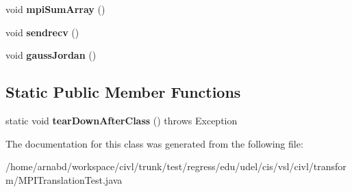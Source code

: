 \begin{DoxyCompactItemize}
\item 
\hypertarget{classedu_1_1udel_1_1cis_1_1vsl_1_1civl_1_1transform_1_1MPITranslationTest_a12381d3fd454d4961687350c6e621189}{}void {\bfseries mpi\+Sum\+Array} ()\label{classedu_1_1udel_1_1cis_1_1vsl_1_1civl_1_1transform_1_1MPITranslationTest_a12381d3fd454d4961687350c6e621189}

\item 
\hypertarget{classedu_1_1udel_1_1cis_1_1vsl_1_1civl_1_1transform_1_1MPITranslationTest_a9a229812fbd00f936189de308ba78826}{}void {\bfseries sendrecv} ()\label{classedu_1_1udel_1_1cis_1_1vsl_1_1civl_1_1transform_1_1MPITranslationTest_a9a229812fbd00f936189de308ba78826}

\item 
\hypertarget{classedu_1_1udel_1_1cis_1_1vsl_1_1civl_1_1transform_1_1MPITranslationTest_abfcb1e4d449b0b4f4dbc44675836613e}{}void {\bfseries gauss\+Jordan} ()\label{classedu_1_1udel_1_1cis_1_1vsl_1_1civl_1_1transform_1_1MPITranslationTest_abfcb1e4d449b0b4f4dbc44675836613e}

\end{DoxyCompactItemize}
\subsection*{Static Public Member Functions}
\begin{DoxyCompactItemize}
\item 
\hypertarget{classedu_1_1udel_1_1cis_1_1vsl_1_1civl_1_1transform_1_1MPITranslationTest_aecf083c083886027bdfc26ca5322ab3a}{}static void {\bfseries tear\+Down\+After\+Class} ()  throws Exception \label{classedu_1_1udel_1_1cis_1_1vsl_1_1civl_1_1transform_1_1MPITranslationTest_aecf083c083886027bdfc26ca5322ab3a}

\end{DoxyCompactItemize}


The documentation for this class was generated from the following file\+:\begin{DoxyCompactItemize}
\item 
/home/arnabd/workspace/civl/trunk/test/regress/edu/udel/cis/vsl/civl/transform/M\+P\+I\+Translation\+Test.\+java\end{DoxyCompactItemize}
